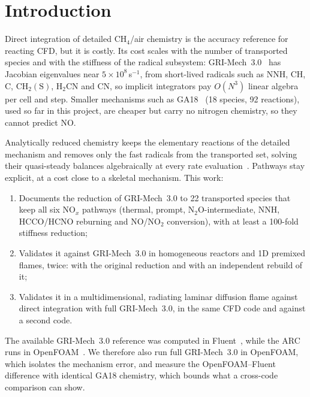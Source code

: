\documentclass[preprint,review,12pt]{elsarticle}
\newcommand{\ce}[1]{\ensuremath{\mathrm{#1}}}
\begin{document}
\section{Introduction}

Direct integration of detailed \ce{CH_{4}}/air chemistry is the accuracy reference for reacting CFD, but it is
costly. Its cost scales with the number of transported species and with the stiffness of the radical subsystem:
GRI-Mech~3.0~\cite{gri30} has Jacobian eigenvalues near $5\times10^{8}$\,s$^{-1}$, from short-lived radicals such as
NNH, CH, C, \ce{CH_{2}(S)}, \ce{H_{2}CN} and CN, so implicit integrators pay $O(N^3)$ linear algebra per cell and step.
Smaller mechanisms such as GA18~\cite{ga18} (18 species, 92 reactions), used so far in this project, are cheaper but carry no
nitrogen chemistry, so they cannot predict NO.

Analytically reduced chemistry keeps the elementary reactions of the detailed mechanism and removes only the fast
radicals from the transported set, solving their quasi-steady balances algebraically at every rate
evaluation~\cite{lu2009review,felden2018}. Pathways stay explicit, at a cost close to a skeletal mechanism. This work:
\begin{enumerate}
\item Documents the reduction of GRI-Mech~3.0 to 22 transported species that keep all six NO$_x$ pathways
(thermal, prompt, \ce{N_{2}O}-intermediate, NNH, HCCO/HCNO reburning and NO/\ce{NO_{2}} conversion), with at least a
100-fold stiffness reduction;
\item Validates it against GRI-Mech~3.0 in homogeneous reactors and 1D premixed flames, twice: with the original
reduction and with an independent rebuild of it;
\item Validates it in a multidimensional, radiating laminar diffusion flame against direct integration with full
GRI-Mech~3.0, in the same CFD code and against a second code.
\end{enumerate}
The available GRI-Mech~3.0 reference was computed in Fluent~\cite{fluent}, while the ARC runs in
OpenFOAM~\cite{openfoam}. We therefore also run full GRI-Mech~3.0 in OpenFOAM, which isolates the mechanism error,
and measure the OpenFOAM--Fluent difference with identical GA18 chemistry, which bounds what a cross-code comparison
can show.

\end{document}
